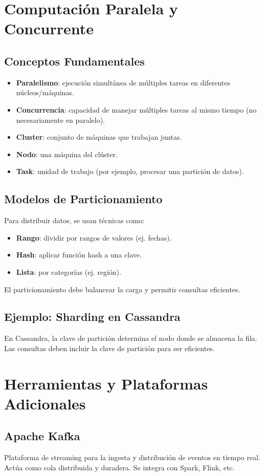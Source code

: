 \documentclass[12pt,a4paper,openany,oneside]{book}
\begin{document}
\chapter{Computación Paralela y Concurrente}
\section{Conceptos Fundamentales}
\begin{itemize}
    \item \textbf{Paralelismo}: ejecución simultánea de múltiples tareas en diferentes núcleos/máquinas.
    \item \textbf{Concurrencia}: capacidad de manejar múltiples tareas al mismo tiempo (no necesariamente en paralelo).
    \item \textbf{Cluster}: conjunto de máquinas que trabajan juntas.
    \item \textbf{Nodo}: una máquina del clúster.
    \item \textbf{Task}: unidad de trabajo (por ejemplo, procesar una partición de datos).
\end{itemize}

\section{Modelos de Particionamiento}
Para distribuir datos, se usan técnicas como:
\begin{itemize}
    \item \textbf{Rango}: dividir por rangos de valores (ej. fechas).
    \item \textbf{Hash}: aplicar función hash a una clave.
    \item \textbf{Lista}: por categorías (ej. región).
\end{itemize}
El particionamiento debe balancear la carga y permitir consultas eficientes.

\section{Ejemplo: Sharding en Cassandra}
En Cassandra, la clave de partición determina el nodo donde se almacena la fila. Las consultas deben incluir la clave de partición para ser eficientes.

\chapter{Herramientas y Plataformas Adicionales}
\section{Apache Kafka}
Plataforma de streaming para la ingesta y distribución de eventos en tiempo real. Actúa como cola distribuida y duradera. Se integra con Spark, Flink, etc.
\end{document}

